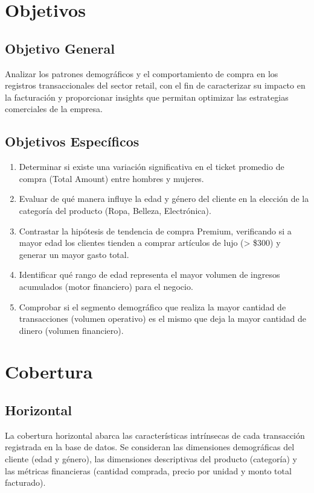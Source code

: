 \documentclass[oneside,11pt]{Latex/Classes/PhDthesisPSnPDF}
\begin{document}
\section{Objetivos}

\subsection{Objetivo General}

Analizar los patrones demográficos y el comportamiento de compra en los
registros transaccionales del sector retail, con el fin de caracterizar
su impacto en la facturación y proporcionar insights que permitan
optimizar las estrategias comerciales de la empresa.

\subsection{Objetivos Específicos}

\begin{enumerate}
  \item Determinar si existe una variación significativa en el ticket promedio de compra (Total Amount) entre hombres y mujeres.
  \item Evaluar de qué manera influye la edad y género del cliente en la elección de la categoría del producto (Ropa, Belleza, Electrónica).
  \item Contrastar la hipótesis de tendencia de compra Premium, verificando si a mayor edad los clientes tienden a comprar artículos de lujo (> \$300) y generar un mayor gasto total.
  \item Identificar qué rango de edad representa el mayor volumen de ingresos acumulados (motor financiero) para el negocio.
  \item Comprobar si el segmento demográfico que realiza la mayor cantidad de transacciones (volumen operativo) es el mismo que deja la mayor cantidad de dinero (volumen financiero).
\end{enumerate}

\section{Cobertura}

\subsection{Horizontal}

La cobertura horizontal abarca las características intrínsecas de cada
transacción registrada en la base de datos. Se consideran las
dimensiones demográficas del cliente (edad y género), las dimensiones
descriptivas del producto (categoría) y las métricas financieras
(cantidad comprada, precio por unidad y monto total facturado).
\end{document}
